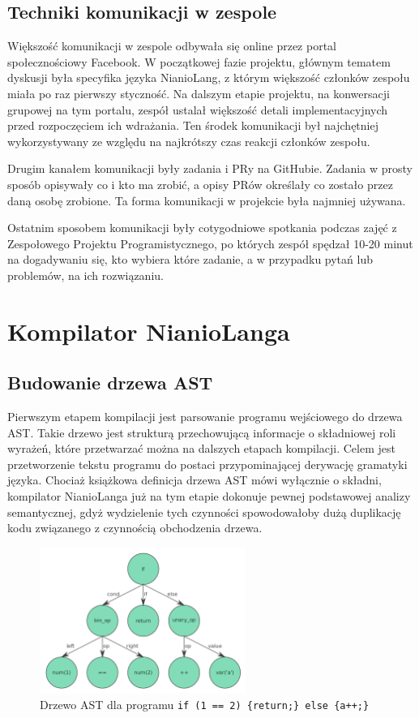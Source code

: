 \documentclass[licencjacka]{pracamgr}
\begin{document}
\section{Techniki komunikacji w zespole}
Większość komunikacji w zespole odbywała się online przez portal społecznościowy Facebook.
W początkowej fazie projektu, głównym tematem dyskusji była specyfika języka NianioLang,
z którym większość członków zespołu miała po raz pierwszy styczność.
Na dalszym etapie projektu, na konwersacji grupowej na tym portalu, zespół
ustalał większość detali implementacyjnych przed rozpoczęciem ich wdrażania.
Ten środek komunikacji był najchętniej wykorzystywany ze względu na najkrótszy czas
reakcji członków zespołu.

Drugim kanałem komunikacji były zadania i PRy na GitHubie. Zadania w prosty sposób
opisywały co i kto ma zrobić, a opisy PRów określały co zostało przez daną osobę zrobione.
Ta forma komunikacji w projekcie była najmniej używana.

Ostatnim sposobem komunikacji były cotygodniowe spotkania podczas zajęć z Zespołowego
Projektu Programistycznego, po których zespół spędzał 10-20 minut na dogadywaniu się,
kto wybiera które zadanie, a w przypadku pytań lub problemów, na ich rozwiązaniu.

\chapter{Kompilator NianioLanga}
\label{sec:compiler}
\section{Budowanie drzewa AST}
Pierwszym etapem kompilacji jest parsowanie programu wejściowego do drzewa AST. Takie drzewo jest strukturą przechowującą informacje o składniowej
roli wyrażeń, które przetwarzać można na dalszych etapach kompilacji. Celem jest przetworzenie tekstu programu do postaci przypominającej derywację
gramatyki języka. Chociaż książkowa definicja drzewa AST mówi wyłącznie o składni, kompilator NianioLanga już na tym etapie dokonuje pewnej
podstawowej analizy semantycznej, gdyż wydzielenie tych czynności spowodowałoby dużą duplikację kodu związanego z czynnością obchodzenia drzewa.

\begin{figure}[h]
  \centering
  \includegraphics[width=0.6\textwidth]{files/ast.png}
  \caption{Drzewo AST dla programu \texttt{if (1 == 2) \{return;\} else \{a++;\}}}
  \label{img:ast}
\end{figure}
\end{document}

